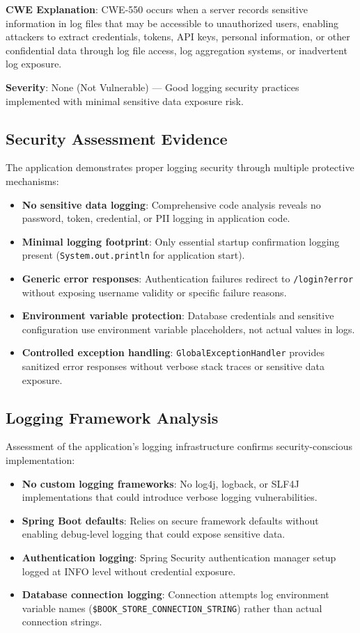 \documentclass[]{UCD_CS_FYP_Report}
\begin{document}
\textbf{CWE Explanation}: CWE-550 occurs when a server records sensitive information in log files that may be accessible to unauthorized users, enabling attackers to extract credentials, tokens, API keys, personal information, or other confidential data through log file access, log aggregation systems, or inadvertent log exposure.

\textbf{Severity}: None (Not Vulnerable) — Good logging security practices implemented with minimal sensitive data exposure risk.

\subsection{Security Assessment Evidence}
The application demonstrates proper logging security through multiple protective mechanisms:
\begin{itemize}
	\item \textbf{No sensitive data logging}: Comprehensive code analysis reveals no password, token, credential, or PII logging in application code.
	\item \textbf{Minimal logging footprint}: Only essential startup confirmation logging present (\texttt{System.out.println} for application start).
	\item \textbf{Generic error responses}: Authentication failures redirect to \texttt{/login?error} without exposing username validity or specific failure reasons.
	\item \textbf{Environment variable protection}: Database credentials and sensitive configuration use environment variable placeholders, not actual values in logs.
	\item \textbf{Controlled exception handling}: \texttt{GlobalExceptionHandler} provides sanitized error responses without verbose stack traces or sensitive data exposure.
\end{itemize}

\subsection{Logging Framework Analysis}
Assessment of the application's logging infrastructure confirms security-conscious implementation:
\begin{itemize}
	\item \textbf{No custom logging frameworks}: No log4j, logback, or SLF4J implementations that could introduce verbose logging vulnerabilities.
	\item \textbf{Spring Boot defaults}: Relies on secure framework defaults without enabling debug-level logging that could expose sensitive data.
	\item \textbf{Authentication logging}: Spring Security authentication manager setup logged at INFO level without credential exposure.
	\item \textbf{Database connection logging}: Connection attempts log environment variable names (\texttt{\${BOOK\_STORE\_CONNECTION\_STRING}}) rather than actual connection strings.
\end{itemize}
\end{document}
